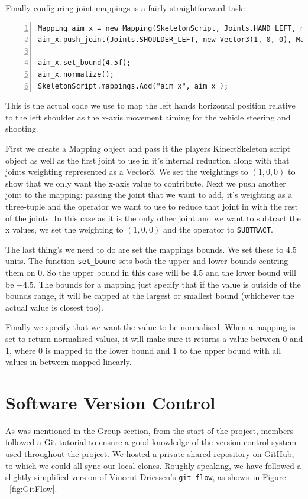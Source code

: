 \documentclass[a4paper,oneside]{memoir}
\begin{document}
			Finally configuring joint mappings is a fairly straightforward task:

			\begin{lstlisting}[language=CSharp,numbers=left,morekeywords={Joints,JointConstraint,Gesture,AnimatedGesture}]
Mapping aim_x = new Mapping(SkeletonScript, Joints.HAND_LEFT, new Vector3(1, 0, 0));
aim_x.push_joint(Joints.SHOULDER_LEFT, new Vector3(1, 0, 0), Mapping.Operators.SUBTRACT);

aim_x.set_bound(4.5f);
aim_x.normalize();
SkeletonScript.mappings.Add("aim_x", aim_x );
			\end{lstlisting}

			This is the actual code we use to map the left hands horizontal position relative to the left shoulder as the x-axis movement aiming for the vehicle steering and shooting.

			First we create a Mapping object and pass it the players KinectSkeleton script object as well as the first joint to use in it's internal reduction along with that joints weighting represented as a Vector3.
			We set the weightings to $(1,0,0)$ to show that we only want the x-axis value to contribute.
			Next we push another joint to the mapping: passing the joint that we want to add, it's weighting as a three-tuple and the operator we want to use to reduce that joint in with the rest of the joints.
			In this case as it is the only other joint and we want to subtract the x values, we set the weighting to $(1,0,0)$ and the operator to \texttt{SUBTRACT}.

			The last thing's we need to do are set the mappings bounds.
			We set these to $4.5$ units.
			The function \texttt{set\_bound} sets both the upper and lower bounds centring them on 0.
			So the upper bound in this case will be $4.5$ and the lower bound will be $-4.5$.
			The bounds for a mapping just specify that if the value is outside of the bounds range, it will be capped at the largest or smallest bound (whichever the actual value is closest too).

			Finally we specify that we want the value to be normalised.
			When a mapping is set to return normalised values, it will make sure it returns a value between 0 and 1, where 0 is mapped to the lower bound and 1 to the upper bound with all values in between mapped linearly.

		\section{Software Version Control}
			As was mentioned in the Group section, from the start of the project, members followed a Git tutorial to ensure a good knowledge of the version control system used throughout the project.
			We hosted a private shared repository on GitHub, to which we could all sync our local clones. 
			Roughly speaking, we have followed a slightly simplified version of Vincent Driessen's \texttt{git-flow}\cite{GitFlow::VincentDriessen}, as shown in Figure ~\ref{fig:GitFlow}.
\end{document}
